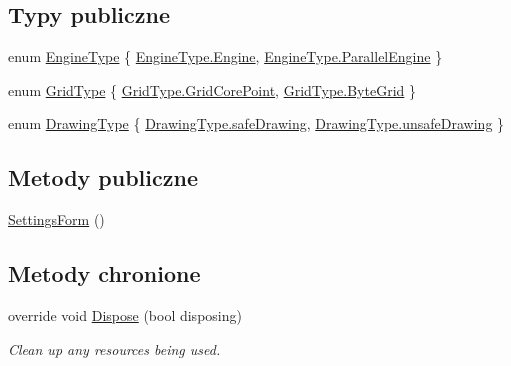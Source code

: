 \subsection*{Typy publiczne}
\begin{DoxyCompactItemize}
\item 
enum \hyperlink{class_convay_1_1_win_forms_game_1_1_settings_form_a37834e752cfe1f75738c237dd98d3d45}{Engine\+Type} \{ \hyperlink{class_convay_1_1_win_forms_game_1_1_settings_form_a37834e752cfe1f75738c237dd98d3d45a7bfa30721c5e726ff17e3f972237a82c}{Engine\+Type.\+Engine}, 
\hyperlink{class_convay_1_1_win_forms_game_1_1_settings_form_a37834e752cfe1f75738c237dd98d3d45a576621e1ea5337ac2d6739014a8e6c3d}{Engine\+Type.\+Parallel\+Engine}
 \}
\item 
enum \hyperlink{class_convay_1_1_win_forms_game_1_1_settings_form_a4226b510bf8cf0a0f4fc5bc2e9c334a6}{Grid\+Type} \{ \hyperlink{class_convay_1_1_win_forms_game_1_1_settings_form_a4226b510bf8cf0a0f4fc5bc2e9c334a6aa977546c97dda57fca9e9290f7c0eef0}{Grid\+Type.\+Grid\+Core\+Point}, 
\hyperlink{class_convay_1_1_win_forms_game_1_1_settings_form_a4226b510bf8cf0a0f4fc5bc2e9c334a6ae57f2cefbe31c647402a66ff65f2d5b9}{Grid\+Type.\+Byte\+Grid}
 \}
\item 
enum \hyperlink{class_convay_1_1_win_forms_game_1_1_settings_form_a7918e2a1b1587472aa065d4db7a13537}{Drawing\+Type} \{ \hyperlink{class_convay_1_1_win_forms_game_1_1_settings_form_a7918e2a1b1587472aa065d4db7a13537a580b802bad2f7fd52207c99b2f4b61cf}{Drawing\+Type.\+safe\+Drawing}, 
\hyperlink{class_convay_1_1_win_forms_game_1_1_settings_form_a7918e2a1b1587472aa065d4db7a13537a6e287e49f28ee39de4675738358180fa}{Drawing\+Type.\+unsafe\+Drawing}
 \}
\end{DoxyCompactItemize}
\subsection*{Metody publiczne}
\begin{DoxyCompactItemize}
\item 
\hyperlink{class_convay_1_1_win_forms_game_1_1_settings_form_addc2d79faecc53f1287e88582bbfc376}{Settings\+Form} ()
\end{DoxyCompactItemize}
\subsection*{Metody chronione}
\begin{DoxyCompactItemize}
\item 
override void \hyperlink{class_convay_1_1_win_forms_game_1_1_settings_form_a5d7c42e4caba886b6485ae8666b563a8}{Dispose} (bool disposing)
\begin{DoxyCompactList}\small\item\em Clean up any resources being used. \end{DoxyCompactList}\end{DoxyCompactItemize}
